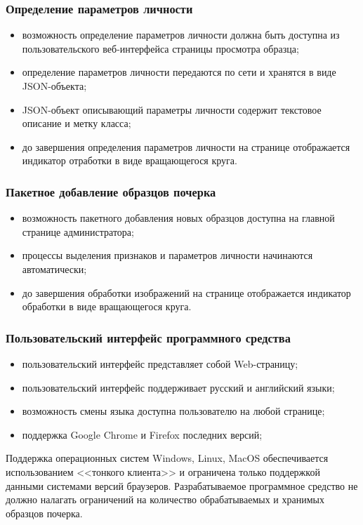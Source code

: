 \subsubsection{Определение параметров личности}
\label{sec:freq:psiho_analysis}
\begin{itemize}
	\item возможность определение параметров личности должна быть доступна из пользовательского веб-интерфейса страницы просмотра образца;
	\item определение параметров личности передаются по сети и хранятся в виде JSON-объекта;
	\item JSON-объект описывающий параметры личности содержит текстовое описание и метку класса;
	\item до завершения определения параметров личности на странице отображается индикатор отработки в виде вращающегося круга.
\end{itemize}

\subsubsection{Пакетное добавление образцов почерка}
\label{sec:freq:package_add}
\begin{itemize}
	\item возможность пакетного добавления новых образцов доступна на главной странице администратора;
	\item процессы выделения признаков и параметров личности начинаются автоматически;
	\item до завершения обработки изображений на странице отображается индикатор обработки в виде вращающегося круга.
\end{itemize}

\subsubsection{Пользовательский интерфейс программного средства}
\begin{itemize}
	\item пользовательский интерфейс представляет собой Web-страницу;
	\item пользовательский интерфейс поддерживает русский и английский \mbox{языки;}
	\item возможность смены языка доступна пользователю на любой \mbox{странице;}
	\item поддержка Google Chrome и Firefox последних версий;
\end{itemize}

Поддержка операционных систем Windows, Linux, MacOS обеспечивается использованием <<тонкого клиента>> и ограничена только поддержкой данными системами версий браузеров.
Разрабатываемое программное средство не должно налагать ограничений на количество обрабатываемых и хранимых образцов почерка.